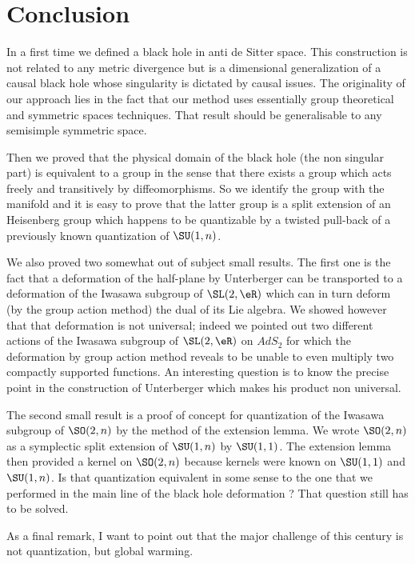 \pagestyle{empty}

\chapter*{Conclusion}

In a first time we defined a black hole in anti de Sitter space. This construction is not related to any metric divergence but is a dimensional generalization of a causal black hole whose singularity is dictated by causal issues. The originality of our approach lies in the fact that our method uses essentially group theoretical and symmetric spaces techniques. That result should be generalisable to any semisimple symmetric space.

Then we proved that the physical domain of the black hole (the non singular part) is equivalent to a group in the sense that there exists a group which acts freely and transitively by diffeomorphisms. So we identify the group with the manifold and it is easy to prove that the latter group is a split extension of an Heisenberg group which happens to be quantizable by a twisted pull-back of a previously known quantization of $\SU(1,n)$. 

We also proved two somewhat out of subject small results. The first one is the fact that a deformation of the half-plane by Unterberger can be transported to a deformation of the Iwasawa subgroup of $\SL(2,\eR)$ which can in turn deform (by the group action method) the dual of its Lie algebra. We  showed however that that deformation is not universal; indeed we pointed out two different actions of the Iwasawa subgroup of $\SL(2,\eR)$ on $AdS_2$ for which the deformation by group action method reveals to be unable to even multiply two compactly supported functions. An interesting question is to know the precise point in the construction of Unterberger which makes his product non universal.

The second small result is a proof of concept for quantization of the Iwasawa subgroup of $\SO(2,n)$ by the method of the extension lemma. We wrote $\SO(2,n)$ as a symplectic split extension of $\SU(1,n)$ by $\SU(1,1)$. The extension lemma then provided a kernel on $\SO(2,n)$ because kernels were known on $\SU(1,1)$ and $\SU(1,n)$. Is that quantization equivalent in some sense to the one that we performed in the main line of the black hole deformation ? That question still has to be solved.

As a final remark, I want to point out that the major challenge of this century is not quantization, but global warming.
